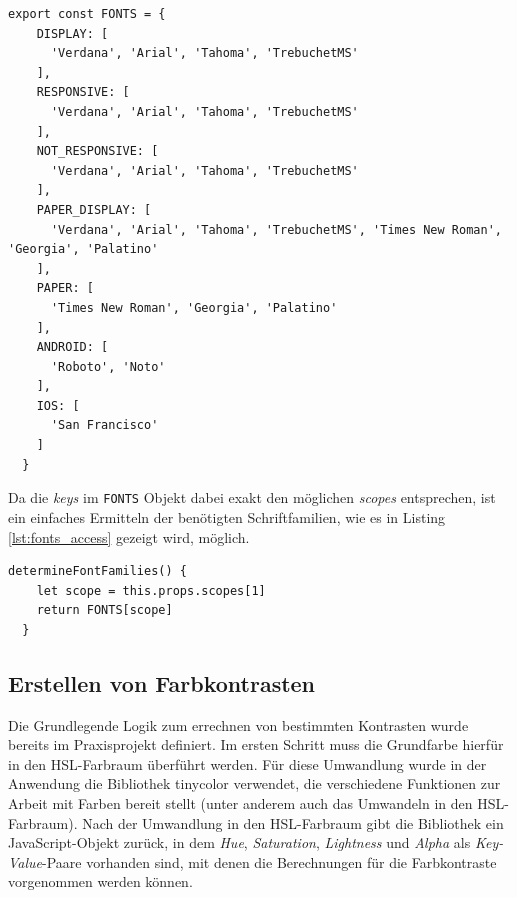 \begin{lstlisting}[caption=Aufbau des \texttt{FONTS} Objektes, label=lst:fonts_object]
  export const FONTS = {
    DISPLAY: [
      'Verdana', 'Arial', 'Tahoma', 'TrebuchetMS'
    ],
    RESPONSIVE: [
      'Verdana', 'Arial', 'Tahoma', 'TrebuchetMS'
    ],
    NOT_RESPONSIVE: [
      'Verdana', 'Arial', 'Tahoma', 'TrebuchetMS'
    ],
    PAPER_DISPLAY: [
      'Verdana', 'Arial', 'Tahoma', 'TrebuchetMS', 'Times New Roman', 'Georgia', 'Palatino'
    ],
    PAPER: [
      'Times New Roman', 'Georgia', 'Palatino'
    ],
    ANDROID: [
      'Roboto', 'Noto'
    ],
    IOS: [
      'San Francisco'
    ]
  }
\end{lstlisting}

Da die \textit{keys} im \verb|FONTS| Objekt dabei exakt den möglichen \textit{scopes} entsprechen\footnotemark{}, ist ein einfaches Ermitteln der benötigten Schriftfamilien, wie es in Listing \ref{lst:fonts_access} gezeigt wird, möglich.


\begin{lstlisting}[caption=Zugriff auf Werte des \texttt{FONTS} Objektes, label=lst:fonts_access]
  determineFontFamilies() {
    let scope = this.props.scopes[1]
    return FONTS[scope]
  }
\end{lstlisting}

\subsection{Erstellen von Farbkontrasten}
\label{chap:colors_dev}
Die Grundlegende Logik zum errechnen von bestimmten Kontrasten wurde bereits im Praxisprojekt definiert. Im ersten Schritt muss die Grundfarbe hierfür in den HSL-Farbraum überführt werden. Für diese Umwandlung wurde in der Anwendung die Bibliothek tinycolor\footnotemark{} verwendet, die verschiedene Funktionen zur Arbeit mit Farben bereit stellt (unter anderem auch das Umwandeln in den HSL-Farbraum).
Nach der Umwandlung in den HSL-Farbraum gibt die Bibliothek ein JavaScript-Objekt zurück, in dem \textit{Hue}, \textit{Saturation}, \textit{Lightness} und \textit{Alpha} als \textit{Key-Value}-Paare vorhanden sind, mit denen die Berechnungen für die Farbkontraste vorgenommen werden können.


